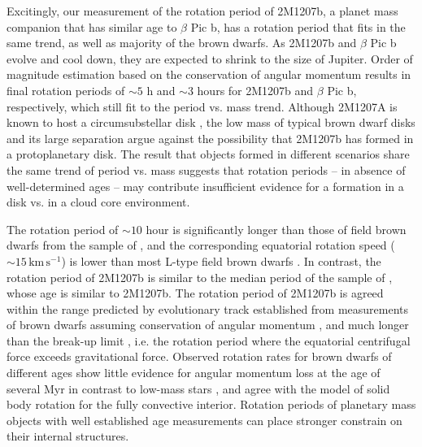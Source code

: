 \documentclass[apj]{emulateapj}
\newcommand{\bpic}{$\beta$ Pic}
\newcommand{\revise}[1]{\textbf{{\color{cyan}{#1}}}}
\renewcommand{\revise}{}
\begin{document}
Excitingly, our measurement of the rotation period of 2M1207b, a
planet mass companion that has similar age to \bpic{} b, has a
rotation period that fits in the same trend, as well as majority of
the brown dwarfs. As 2M1207b and \bpic{} b evolve and cool down, they are
expected to shrink to the size of Jupiter. Order of magnitude
estimation based on the conservation of angular momentum results in
final rotation periods of $\sim 5$ h and $\sim 3$ hours
\citep{Snellen2014} for 2M1207b and \bpic{} b, respectively, which
still fit to the period vs. mass trend. Although 2M1207A is known to
host a circumsubstellar disk \citep{Sterzik2004}, the low mass of
typical brown dwarf disks \citep[e.g.][]{Klein2003, Mohanty2013} and its
large separation argue against the possibility that 2M1207b has formed
in a protoplanetary disk.  The result that objects formed in different
scenarios share the same trend of period vs. mass suggests that
rotation periods -- in absence of well-determined ages -- may
contribute insufficient evidence for a formation in a disk vs. in a
cloud core environment.

\revise{ The rotation period of $\sim 10$
  hour is significantly longer than those of field brown dwarfs from the sample
  of \cite{Metchev2015}, and the corresponding equatorial rotation
  speed ($\sim 15\, \mathrm{km\,s^{-1}}$) is lower than most L-type field
  brown dwarfs \citep[][]{Reiners2008}.
  In contrast, the rotation period of 2M1207b is similar to the median period
  of the sample of \cite{Scholz2015}, whose age is similar
  to 2M1207b. The rotation period of 2M1207b
  is agreed within the range predicted by evolutionary track
  established from measurements of brown dwarfs assuming conservation
  of angular momentum \citep[see Fig. 4 of ][]{Scholz2015}, and much longer
  than the break-up limit \citep{Marley2011}, i.e. the rotation period where the
  equatorial centrifugal force exceeds gravitational force. Observed
  rotation rates for brown dwarfs of different ages show little
  evidence for angular momentum loss at the age of several Myr in contrast to low-mass stars
  \citep{Bouvier2014, Scholz2015}, and agree with the model of solid
  body rotation for the fully convective interior. Rotation periods of
planetary mass objects with well established age measurements can
place stronger constrain on their internal structures.}

\end{document}
